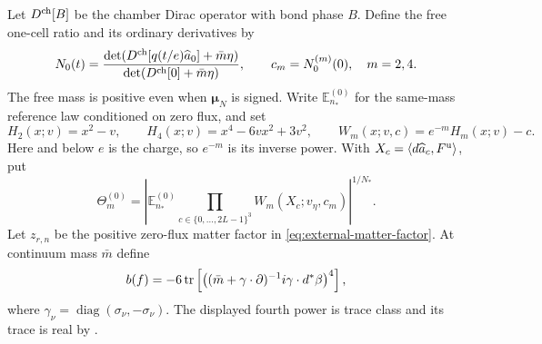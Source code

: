 Let $D^{\rm ch}[B]$ be the chamber Dirac operator with bond
phase $B$. Define the free one-cell ratio and its ordinary
derivatives by
\begin{equation}\label{eq:response-coefficient-relations}
 N_0(t)=\frac{\det(D^{\rm ch}[q(t/e)\widehat a_0]+\bar m\eta)}
                    {\det(D^{\rm ch}[0]+\bar m\eta)},\qquad
 c_m=N_0^{(m)}(0),\quad m=2,4.
\end{equation}
The free mass is positive even when $\boldsymbol\mu_N$ is signed.
Write $\mathbb E^{(0)}_{n_*}$ for the same-mass reference law
conditioned on zero flux, and set
\begin{equation}\label{eq:vtm-Wick}
 H_2(x;v)=x^2-v,\qquad H_4(x;v)=x^4-6vx^2+3v^2,\qquad
 W_m(x;v,c)=e^{-m}H_m(x;v)-c.
\end{equation}
Here and below $e$ is the charge, so $e^{-m}$ is its inverse
power. With $X_c=\langle d\widehat a_c,F^{\rm u}\rangle$, put
\begin{equation}\label{eq:vtm-reference-root}
 \Theta_m^{(0)}
 =\left|\mathbb E_{n_*}^{(0)}
       \prod_{c\in\{0,\ldots,2L-1\}^3}W_m(X_c;v_\eta,c_m)
   \right|^{1/N_*}.
\end{equation}
Let $z_{r,n}$ be the positive zero-flux matter factor in
\eqref{eq:external-matter-factor}. At continuum mass $\bar m$ define
\[
 b(f)=-6\operatorname{tr}\left[
    \bigl((\bar m+\gamma\cdot\partial)^{-1}i\gamma\cdot d^*\beta
                 \bigr)^4\right],
\]
where $\gamma_\nu=\operatorname{diag}(\sigma_\nu,-\sigma_\nu)$.
The displayed fourth power is trace class and its trace is real
by \cite[Theorem~A]{PositiveProbe}.

